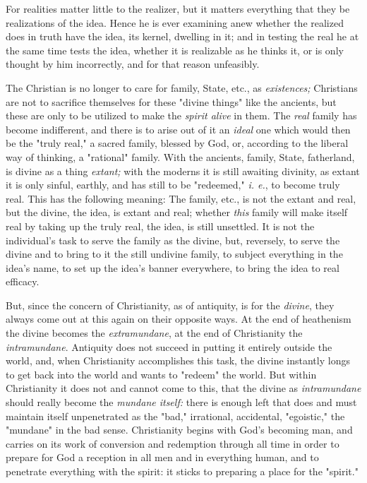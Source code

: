 \documentclass[a4paper]{book}
\begin{document}
For realities matter little to the realizer, but it matters everything that 
they be realizations of the idea. Hence he is ever examining anew whether the 
realized does in truth have the idea, its kernel, dwelling in it; and in 
testing the real he at the same time tests the idea, whether it is realizable 
as he thinks it, or is only thought by him incorrectly, and for that reason 
unfeasibly.

The Christian is no longer to care for family, State, etc., as 
\textit{existences;} Christians are not to sacrifice themselves for these 
"{}divine things"{} like the ancients, but these are only to be utilized to 
make the \textit{spirit alive} in them. The \textit{real} family has become 
indifferent, and there is to arise out of it an \textit{ideal} one which would 
then be the "{}truly real,"{} a sacred family, blessed by God, or, according 
to the liberal way of thinking, a "{}rational"{} family. With the ancients, 
family, State, fatherland, is divine as a thing \textit{extant;} with the 
moderns it is still awaiting divinity, as extant it is only sinful, earthly, 
and has still to be "{}redeemed,"{} \textit{i. e.}, to become truly real. This 
has the following meaning: The family, etc., is not the extant and real, but 
the divine, the idea, is extant and real; whether \textit{this} family will 
make itself real by taking up the truly real, the idea, is still unsettled. It 
is not the individual's task to serve the family as the divine, but, 
reversely, to serve the divine and to bring to it the still undivine family, 
to subject everything in the idea's name, to set up the idea's banner 
everywhere, to bring the idea to real efficacy.

But, since the concern of Christianity, as of antiquity, is for the 
\textit{divine}, they always come out at this again on their opposite ways. At 
the end of heathenism the divine becomes the \textit{extramundane}, at the end 
of Christianity the \textit{intramundane}. Antiquity does not succeed in 
putting it entirely outside the world, and, when Christianity accomplishes 
this task, the divine instantly longs to get back into the world and wants to 
"{}redeem"{} the world. But within Christianity it does not and cannot come to 
this, that the divine as \textit{intramundane} should really become the 
\textit{mundane itself:} there is enough left that does and must maintain 
itself unpenetrated as the "{}bad,"{} irrational, accidental, "{}egoistic,"{} 
the "{}mundane"{} in the bad sense. Christianity begins with God's becoming 
man, and carries on its work of conversion and redemption through all time in 
order to prepare for God a reception in all men and in everything human, and 
to penetrate everything with the spirit: it sticks to preparing a place for 
the "{}spirit."{}
\end{document}
